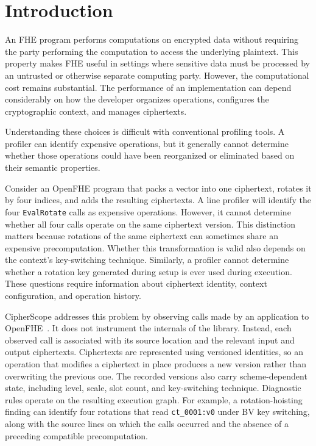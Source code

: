 \documentclass[pdflatex,sn-basic,Numbered,iicol]{sn-jnl}
\begin{document}

\maketitle

\section{Introduction}
\label{sec:intro}

An FHE program performs computations on encrypted data without requiring the
party performing the computation to access the underlying plaintext. This
property makes FHE useful in settings where sensitive data must be processed
by an untrusted or otherwise separate computing party. However, the
computational cost remains substantial. The performance of an implementation
can depend considerably on how the developer organizes operations, configures
the cryptographic context, and manages ciphertexts.

Understanding these choices is difficult with conventional profiling tools. A
profiler can identify expensive operations, but it generally cannot determine
whether those operations could have been reorganized or eliminated based on
their semantic properties.

Consider an OpenFHE program that packs a vector into one ciphertext, rotates
it by four indices, and adds the resulting ciphertexts. A line profiler will
identify the four \texttt{EvalRotate} calls as expensive operations. However,
it cannot determine whether all four calls operate on the same ciphertext
version. This distinction matters because rotations of the same ciphertext
can sometimes share an expensive precomputation. Whether this transformation
is valid also depends on the context's key-switching technique. Similarly, a
profiler cannot determine whether a rotation key generated during setup is
ever used during execution. These questions require information about
ciphertext identity, context configuration, and operation history.

CipherScope addresses this problem by observing calls made by an application
to OpenFHE~\cite{openfhe2022}. It does not instrument the internals of the
library. Instead, each observed call is associated with its source location
and the relevant input and output ciphertexts. Ciphertexts are represented
using versioned identities, so an operation that modifies a ciphertext in
place produces a new version rather than overwriting the previous one. The
recorded versions also carry scheme-dependent state, including level, scale,
slot count, and key-switching technique. Diagnostic rules operate on the
resulting execution graph. For example, a rotation-hoisting finding can
identify four rotations that read \texttt{ct\_0001:v0} under BV key
switching, along with the source lines on which the calls occurred and the
absence of a preceding compatible precomputation.
\end{document}
